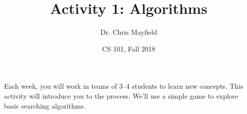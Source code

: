 \documentclass[12pt]{article}
\title{Activity 1: Algorithms}
\author{Dr. Chris Mayfield}
\date{CS 101, Fall 2018}
\begin{document}
\maketitle

Each week, you will work in teams of 3--4 students to learn new concepts.
This activity will introduce you to the process.
We'll use a simple game to explore basic searching algorithms.

%

\end{document}
